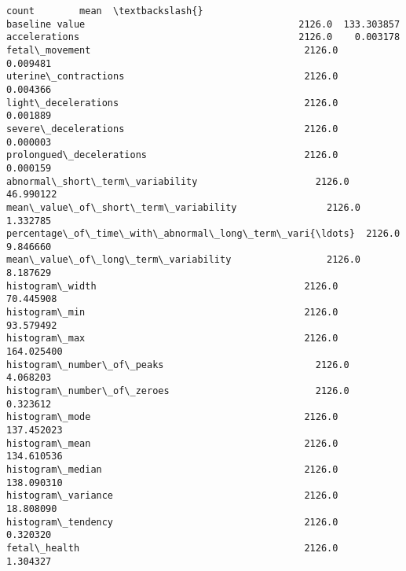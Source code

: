 \documentclass[11pt]{article}
\makeatletter
\newcommand{\boxspacing}{\kern\kvtcb@left@rule\kern\kvtcb@boxsep}
\makeatother
\begin{document}
            \begin{tcolorbox}[breakable, size=fbox, boxrule=.5pt, pad at break*=1mm, opacityfill=0]
{\boxspacing}
\begin{Verbatim}[commandchars=\\\{\}]
                                                     count        mean  \textbackslash{}
baseline value                                      2126.0  133.303857
accelerations                                       2126.0    0.003178
fetal\_movement                                      2126.0    0.009481
uterine\_contractions                                2126.0    0.004366
light\_decelerations                                 2126.0    0.001889
severe\_decelerations                                2126.0    0.000003
prolongued\_decelerations                            2126.0    0.000159
abnormal\_short\_term\_variability                     2126.0   46.990122
mean\_value\_of\_short\_term\_variability                2126.0    1.332785
percentage\_of\_time\_with\_abnormal\_long\_term\_vari{\ldots}  2126.0    9.846660
mean\_value\_of\_long\_term\_variability                 2126.0    8.187629
histogram\_width                                     2126.0   70.445908
histogram\_min                                       2126.0   93.579492
histogram\_max                                       2126.0  164.025400
histogram\_number\_of\_peaks                           2126.0    4.068203
histogram\_number\_of\_zeroes                          2126.0    0.323612
histogram\_mode                                      2126.0  137.452023
histogram\_mean                                      2126.0  134.610536
histogram\_median                                    2126.0  138.090310
histogram\_variance                                  2126.0   18.808090
histogram\_tendency                                  2126.0    0.320320
fetal\_health                                        2126.0    1.304327


\end{Verbatim}
\end{tcolorbox}
\end{document}
